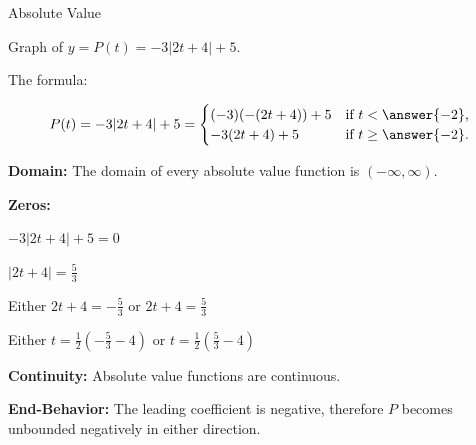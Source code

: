 \documentclass{ximera}
\begin{document}
\begin{example}  Absolute Value

Graph of $y = P(t) = -3|2t+4|+5$.


\begin{image}
\end{image}

The formula:

\[
P(t) = -3|2t+4|+5 = 
\begin{cases}
  (-3)(-(2t+4))+5 & \text{if $t < \answer{-2}$,}\\
   -3(2t+4)+5 & \text{if $t \ge \answer{-2}$}.
\end{cases}
\]



\textbf{Domain:} The domain of every absolute value function is $(-\infty, \infty)$.

\textbf{Zeros:}

\begin{center}
$-3|2t+4|+5 = 0$

$|2t+4| = \frac{5}{3}$

Either $2t+4 = -\frac{5}{3}$ or $2t+4 = \frac{5}{3}$

Either $t = \frac{1}{2} \left( -\frac{5}{3}-4 \right)$ or $t = \frac{1}{2} \left(\frac{5}{3} - 4 \right)$

\end{center}





\textbf{Continuity:} Absolute value functions are continuous.

\textbf{End-Behavior:} The leading coefficient is negative, therefore $P$ becomes unbounded negatively in either direction.




\end{example}
\end{document}

